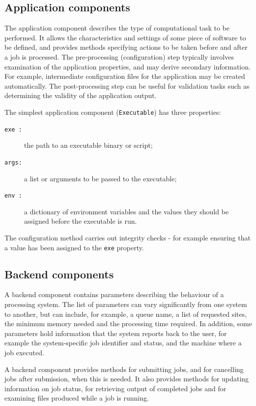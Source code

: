 \documentclass{elsart}
\newcommand{\code}[1]{\texttt{#1}}
\begin{document}
\subsection{Application components}

The application component describes the type of computational task to be
performed.  It allows the characteristics and settings of some
piece of software to be defined, and provides methods specifying
actions to be taken before and after a job is processed.  The
pre-processing (configuration) step typically involves examination of
the application properties, and may derive secondary
information. For example, intermediate configuration files for the
application may be created automatically. The post-processing step can
be useful for validation tasks such as determining the validity
of the application output.

The simplest application component (\texttt{Executable}) has three properties:
\begin{description}
\item[\code{exe :}] the path to an executable binary or script;
\item[\code{args:}] a list or arguments to be passed to the executable;
\item[\code{env :}] a dictionary of environment variables and the values they
  should be assigned before the executable is run.
\end{description}
The configuration method carries out integrity checks - for example
ensuring that a value has been assigned to the \code{exe} property.

\subsection{Backend components}
A backend component contains parameters describing the
behaviour of a processing system. The list of
parameters can vary significantly from one system to another, but can include,
for example, a queue name, a list of requested sites, the minimum memory
needed and the processing time required. In addition, some parameters hold
information that the system reports back to the user, for example the 
system-specific job identifier and status, and the machine where a
job executed.

A backend component provides methods for submitting jobs, and for cancelling
jobs after submission, when this is needed.  It also provides methods for
updating information on job status, for retrieving output of completed jobs
and for examining files produced while a job is running.
\end{document}
